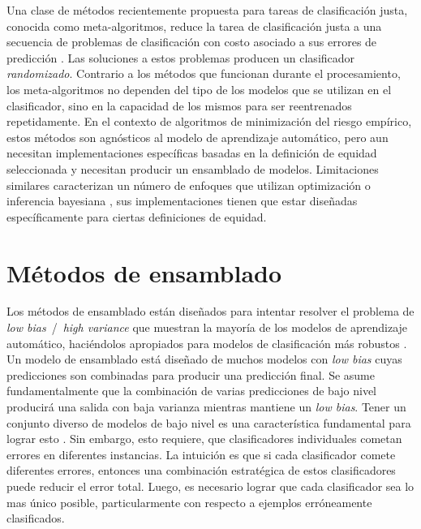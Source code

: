 Una clase de métodos recientemente propuesta para tareas de clasificación justa, conocida como meta-algoritmos, reduce la tarea de clasificación justa a una secuencia de problemas de clasificación con costo asociado a sus errores de predicción \parencite{agarwal2018reductions, agarwal2019fair, kearns2018preventing}.
Las soluciones a estos problemas producen un clasificador \emph{randomizado}. Contrario a los métodos que funcionan durante el procesamiento, los meta-algoritmos no dependen del tipo de los modelos que se utilizan en el clasificador, sino en la capacidad de los mismos para ser reentrenados repetidamente.
En el contexto de algoritmos de minimización del riesgo empírico, estos métodos son agnósticos al modelo de aprendizaje automático, pero aun necesitan implementaciones específicas basadas en la definición de equidad seleccionada y necesitan producir un ensamblado de modelos. Limitaciones similares caracterizan un número de enfoques que utilizan optimización \parencite{chiappa2018causal,Dimitrakakis_Liu_Parkes_Radanovic_2019} o inferencia bayesiana \parencite{kearns2018preventing,thomas2019preventing}, sus implementaciones tienen que estar diseñadas específicamente para ciertas definiciones de equidad.


\section{Métodos de ensamblado}\label{section:ensembles}

Los métodos de ensamblado están diseñados para intentar resolver el problema de \emph{low bias}~/~\emph{high variance} que muestran la mayoría de los modelos de aprendizaje automático, haciéndolos apropiados para modelos de clasificación más robustos \parencite{polikar2006ensemble}.
Un modelo de ensamblado está diseñado de muchos modelos con \emph{low bias} cuyas predicciones son combinadas para producir una predicción final.
Se asume fundamentalmente que la combinación de varias predicciones de bajo nivel producirá una salida con baja varianza mientras mantiene un \emph{low bias}.
Tener un conjunto diverso de modelos de bajo nivel es una característica fundamental para lograr esto \parencite{polikar2006ensemble}.
Sin embargo, esto requiere, que clasificadores individuales cometan errores en diferentes instancias.
La intuición es que si cada clasificador comete diferentes errores, entonces una combinación estratégica de estos clasificadores puede reducir el error total. Luego, es necesario lograr que cada clasificador sea lo mas único posible, particularmente con respecto a ejemplos erróneamente clasificados.

